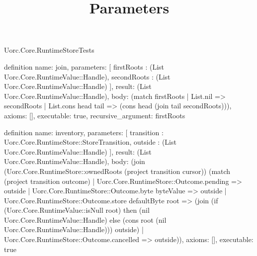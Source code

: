 \begin{lexlean}{Uorc.Core.RuntimeStoreTests}





\title{Parameters}

\begin{semanticmodule}
definition{
  name: join,
  parameters: [
    firstRoots : (List Uorc.Core.RuntimeValue::Handle),
    secondRoots : (List Uorc.Core.RuntimeValue::Handle)
  ],
  result: (List Uorc.Core.RuntimeValue::Handle),
  body: (match firstRoots
    | List.nil => secondRoots
    | List.cons head tail => (cons head (join tail secondRoots))),
  axioms: [],
  executable: true,
  recursive_argument: firstRoots
}

definition{
  name: inventory,
  parameters: [
    transition : Uorc.Core.RuntimeStore::StoreTransition,
    outside : (List Uorc.Core.RuntimeValue::Handle)
  ],
  result: (List Uorc.Core.RuntimeValue::Handle),
  body: (join (Uorc.Core.RuntimeStore::ownedRoots (project transition cursor)) (match (project transition outcome)
    | Uorc.Core.RuntimeStore::Outcome.pending => outside
    | Uorc.Core.RuntimeStore::Outcome.byte byteValue => outside
    | Uorc.Core.RuntimeStore::Outcome.store defaultByte root => (join (if (Uorc.Core.RuntimeValue::isNull root) then (nil Uorc.Core.RuntimeValue::Handle) else (cons root (nil Uorc.Core.RuntimeValue::Handle))) outside)
    | Uorc.Core.RuntimeStore::Outcome.cancelled => outside)),
  axioms: [],
  executable: true
}


\end{semanticmodule}
\end{lexlean}
